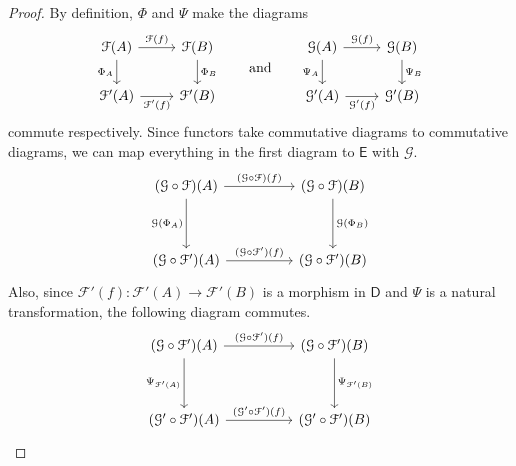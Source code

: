 \documentclass[a4paper]{report}
\theoremstyle{definition}
\theoremstyle{plain}
\theoremstyle{remark}
\begin{document}
\begin{proof}
  By definition, $\Phi$ and $\Psi$ make the diagrams
  \begin{equation*}
    \begin{tikzcd}
      \mathcal{F}(A)
      \arrow[d, swap, "\Phi_{A}"] 
      \arrow[r, "\mathcal{F}(f)"] 
      & \mathcal{F}(B)
      \arrow[d, "\Phi_{B}"] 
      \\
      \mathcal{F}'(A) 
      \arrow[r, swap, "\mathcal{F}'(f)"] 
      & \mathcal{F}'(B) 
    \end{tikzcd}
    \qquad\text{and}\qquad
    \begin{tikzcd}
      \mathcal{G}(A)
      \arrow[d, swap, "\Psi_{A}"] 
      \arrow[r, "\mathcal{G}(f)"] 
      & \mathcal{G}(B)
      \arrow[d, "\Psi_{B}"] 
      \\
      \mathcal{G}'(A) 
      \arrow[r, swap, "\mathcal{G}'(f)"] 
      & \mathcal{G}'(B) 
    \end{tikzcd}
  \end{equation*}
  commute respectively. Since functors take commutative diagrams to commutative diagrams, we can map everything in the first diagram to $\mathsf{E}$ with $\mathcal{G}$.
  \begin{equation*}
    \begin{tikzcd}[row sep=huge, column sep=huge]
      (\mathcal{G} \circ \mathcal{F})(A)
      \arrow[d, swap, "\mathcal{G}(\Phi_{A})"] 
      \arrow[r, "(\mathcal{G} \circ \mathcal{F})(f)"] 
      & (\mathcal{G} \circ \mathcal{F})(B)
      \arrow[d, "\mathcal{G}(\Phi_{B})"] 
      \\
      (\mathcal{G} \circ \mathcal{F}')(A) 
      \arrow[r, "(\mathcal{G} \circ \mathcal{F}')(f)"] 
      & (\mathcal{G} \circ \mathcal{F}')(B) 
    \end{tikzcd}
  \end{equation*}
  Also, since $\mathcal{F}'(f)\colon \mathcal{F}'(A) \to \mathcal{F}'(B)$ is a morphism in $\mathsf{D}$ and $\Psi$ is a natural transformation, the following diagram commutes.
  \begin{equation*}
    \begin{tikzcd}[row sep=huge, column sep=huge]
      (\mathcal{G} \circ \mathcal{F}')(A)
      \arrow[r, "(\mathcal{G} \circ \mathcal{F}')(f)"]
      \arrow[d, swap, "\Psi_{\mathcal{F}'(A)}"]
      & (\mathcal{G} \circ \mathcal{F}')(B)
      \arrow[d, "\Psi_{\mathcal{F}'(B)}"]
      \\
      (\mathcal{G}' \circ \mathcal{F}')(A)
      \arrow[r, "(\mathcal{G}' \circ \mathcal{F}')(f)"]
      & (\mathcal{G}' \circ \mathcal{F}')(B)
    \end{tikzcd}
  \end{equation*}


\end{proof}
\end{document}
